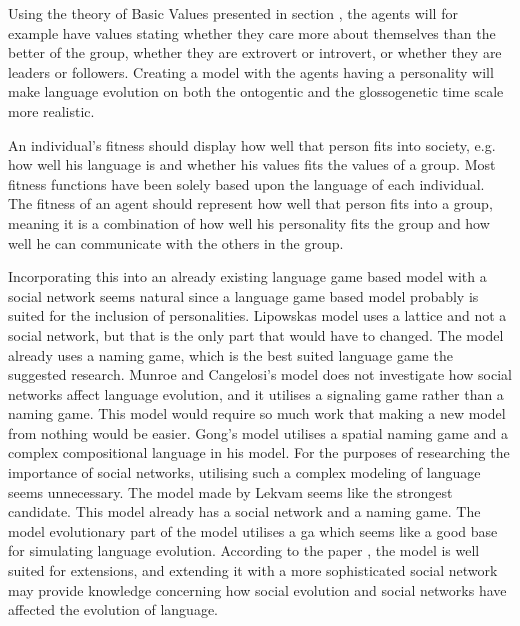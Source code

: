 Using the theory of Basic Values presented in section \label{SchwartzBasicValues}, the agents will for example have values stating whether they care more about themselves than the better of the group, whether they are extrovert or introvert, or whether they are leaders or followers. Creating a model with the agents having a personality will make language evolution on both the ontogentic and the glossogenetic time scale more realistic. 

An individual's fitness should display how well that person fits into society, e.g. how well his language is and whether his values fits the values of a group. Most fitness functions have been solely based upon the language of each individual. The fitness of an agent should represent how well that person fits into a group, meaning it is a combination of how well his personality fits the group and how well he can communicate with the others in the group. 

Incorporating this into an already existing language game based model with a social network seems natural since a language game based model probably is suited for the inclusion of personalities. Lipowskas model uses a lattice and not a social network, but that is the only part that would have to changed. The model already uses a naming game, which is the best suited language game the suggested research. Munroe and Cangelosi's model does not investigate how social networks affect language evolution, and it utilises a signaling game rather than a naming game. This model would require so much work that making a new model from nothing would be easier. Gong's model utilises a spatial naming game and a complex compositional language in his model. For the purposes of researching the importance of social networks, utilising such a complex modeling of language seems unnecessary. The model made by Lekvam seems like the strongest candidate. This model already has a social network and a naming game. The model evolutionary part of the model utilises a \ac{ga} which seems like a good base for simulating language evolution. According to the paper \citep{lekvam2014co}, the model is well suited for extensions, and extending it with a more sophisticated social network may provide knowledge concerning how social evolution and social networks have affected the evolution of language. 
